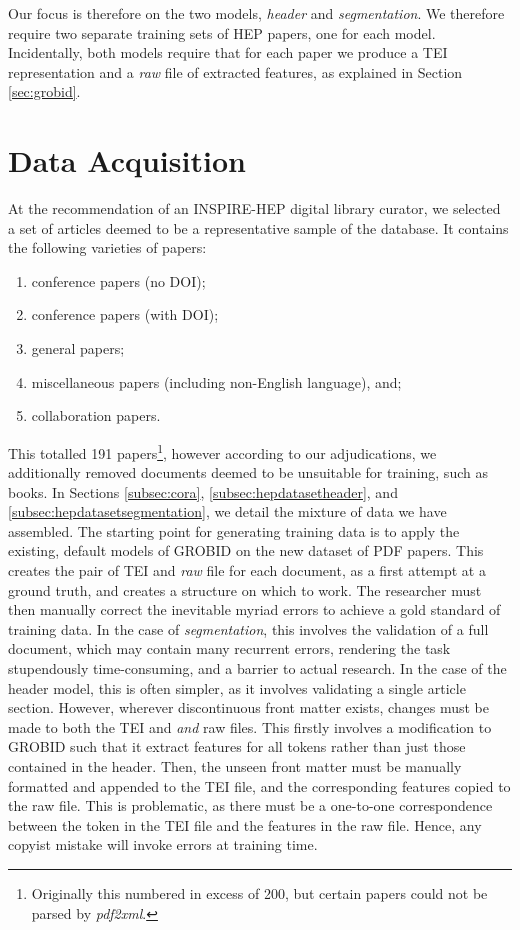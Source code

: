 Our focus is therefore on the two models, \emph{header} and \emph{segmentation}. We therefore require two separate training sets of HEP papers, one for each model. Incidentally, both models require that for each paper we produce a TEI representation and a \emph{raw} file of extracted features, as explained in Section \ref{sec:grobid}.

\section{Data Acquisition}
\label{sec:data}

At the recommendation of an INSPIRE-HEP digital library curator, we selected a set of articles deemed to be a representative sample of the database. It contains the following varieties of papers:

\begin{enumerate}
\item conference papers (no DOI);
\item conference papers (with DOI);
\item general papers;
\item miscellaneous papers (including non-English language), and;
\item collaboration papers.
\end{enumerate}

This totalled 191 papers\footnote{Originally this numbered in excess of 200, but certain papers could not be parsed by \emph{pdf2xml}.}, however according to our adjudications, we additionally removed documents deemed to be unsuitable for training, such as books. In Sections \ref{subsec:cora}, \ref{subsec:hepdatasetheader}, and \ref{subsec:hepdatasetsegmentation}, we detail the mixture of data we have assembled. The starting point for generating training data is to apply the existing, default models of GROBID on the new dataset of PDF papers. This creates the pair of TEI and \emph{raw} file for each document, as a first attempt at a ground truth, and creates a structure on which to work. The researcher must then manually correct the inevitable myriad errors to achieve a gold standard of training data. In the case of \emph{segmentation}, this involves the validation of a full document, which may contain many recurrent errors, rendering the task stupendously time-consuming, and a barrier to actual research. In the case of the header model, this is often simpler, as it involves validating a single article section. However, wherever discontinuous front matter exists, changes must be made to both the TEI and \emph{and} raw files. This firstly involves a modification to GROBID such that it extract features for all tokens rather than just those contained in the header. Then, the unseen front matter must be manually formatted and appended to the TEI file, and the corresponding features copied to the raw file. This is problematic, as there must be a one-to-one correspondence between the token in the TEI file and the features in the raw file. Hence, any copyist mistake will invoke errors at training time.

